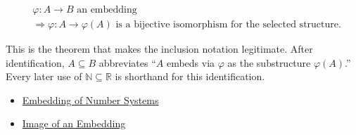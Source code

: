 \begin{remark*}
\[
\begin{aligned}
&\varphi:A\to B \text{ an embedding}\\
&\Longrightarrow \varphi:A\to\varphi(A) \text{ is a bijective isomorphism for the selected structure.}
\end{aligned}
\]
\end{remark*}
\begin{remark*}[Interpretation]
This is the theorem that makes the inclusion notation legitimate. After
identification, $A\subseteq B$ abbreviates ``$A$ embeds via $\varphi$ as the
substructure $\varphi(A)$.'' Every later use of
$\mathbb{N}\subseteq\mathbb{R}$ is shorthand for this identification.
\end{remark*}
\begin{dependencies}
\begin{itemize}
  \item \hyperref[def:number-system-embedding]{Embedding of Number Systems}
  \item \hyperref[def:image-of-embedding]{Image of an Embedding}
\end{itemize}
\end{dependencies}
